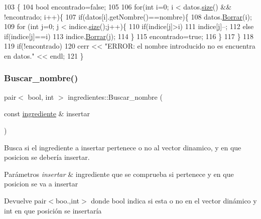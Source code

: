 \begin{DoxyCode}
103                                               \{
104     \textcolor{keywordtype}{bool} encontrado=\textcolor{keyword}{false};
105         
106     \textcolor{keywordflow}{for}(\textcolor{keywordtype}{int} i=0; i < datos.\hyperlink{classVD_a411ad026db1c8e0617d9031f1f1017a5}{size}() && !encontrado; i++)\{
107         \textcolor{keywordflow}{if}(datos[i].getNombre()==nombre)\{
108             datos.\hyperlink{classVD_a033d6e246f6a49cf66a1cad25b52aa8b}{Borrar}(i);
109             \textcolor{keywordflow}{for} (\textcolor{keywordtype}{int} j=0; j < indice.\hyperlink{classVD_a411ad026db1c8e0617d9031f1f1017a5}{size}();j++)\{
110                 \textcolor{keywordflow}{if}(indice[j]>i)
111                     indice[j]--;
112                 \textcolor{keywordflow}{else} \textcolor{keywordflow}{if}(indice[j]==i)
113                     indice.\hyperlink{classVD_a033d6e246f6a49cf66a1cad25b52aa8b}{Borrar}(j);
114             \}
115             encontrado=\textcolor{keyword}{true};
116         \}
117     \}
118 
119     \textcolor{keywordflow}{if}(!encontrado)
120         cerr << \textcolor{stringliteral}{"ERROR: el nombre introducido no es encuentra en datos."} << endl;   
121 \}
\end{DoxyCode}
\mbox{\label{classingredientes_a5a2723852db946495aca5f70c81f5fb9}} 
\subsubsection{\texorpdfstring{Buscar\+\_\+nombre()}{Buscar\_nombre()}}
{\footnotesize\ttfamily pair$<$ bool, int $>$ ingredientes\+::\+Buscar\+\_\+nombre (\begin{DoxyParamCaption}\item[{const \hyperlink{classingrediente}{ingrediente} \&}]{insertar }\end{DoxyParamCaption})}



Busca si el ingrediente a insertar pertenece o no al vector dinamico, y en que posicion se debería insertar. 


\begin{DoxyParams}{Parámetros}
{\em insertar} & ingrediente que se comprueba si pertenece y en que posicion se va a insertar \\
\hline
\end{DoxyParams}
\begin{DoxyReturn}{Devuelve}
pair$<$boo.,int$>$ donde bool indica si esta o no en el vector dinámico y int en que posición se insertaría 
\end{DoxyReturn}


